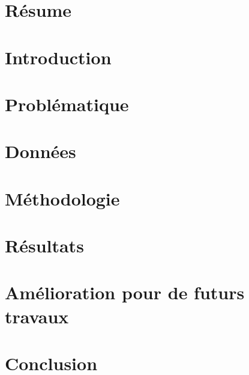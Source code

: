 \documentclass[12pt,a4paper]{article}
\begin{document}

\def\appendixpage{\vspace*{0cm}
\begin{center}
\Huge\textbf{Annexes}
\end{center}
}
\def\appendixname{Annexe}%
\newpage
\mbox{}
\newpage
\tableofcontents
\newpage
\section{R\'esume}

\section{Introduction}

\newpage
\section{Probl\'ematique}
\section{Données}

\section{M\'ethodologie}

\newpage
\section{R\'esultats}


\section{Am\'elioration pour de futurs travaux}


\section{Conclusion}



\newpage

\end{document}
